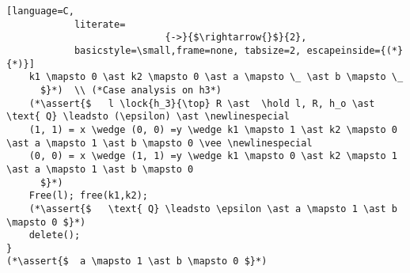 \documentclass[8pt]{article}
\newcommand{\lock}[2]{ \square \hspace{-1ex} \xrightarrow[#1]{#2}}
\newcommand{\hold}{\text{Hold }}
\newcommand{\assert}[1]{\textcolor{blue}{ \{ #1 \}  } }
\newcommand{\newlinespecial}{\newline \hphantom{100pt}}
\begin{document}
\begin{lstlisting}[language=C,
			literate=
               				{->}{$\rightarrow{}$}{2},
			basicstyle=\small,frame=none, tabsize=2, escapeinside={(*}{*)}]
	k1 \mapsto 0 \ast k2 \mapsto 0 \ast a \mapsto \_ \ast b \mapsto \_
	  $}*)  \\ (*Case analysis on h3*)
	(*\assert{$   l \lock{h_3}{\top} R \ast  \hold l, R, h_o \ast  \text{ Q} \leadsto (\epsilon) \ast \newlinespecial
	(1, 1) = x \wedge (0, 0) =y \wedge k1 \mapsto 1 \ast k2 \mapsto 0 \ast a \mapsto 1 \ast b \mapsto 0 \vee \newlinespecial
	(0, 0) = x \wedge (1, 1) =y \wedge k1 \mapsto 0 \ast k2 \mapsto 1 \ast a \mapsto 1 \ast b \mapsto 0
	  $}*) 
	Free(l); free(k1,k2);
	(*\assert{$   \text{ Q} \leadsto \epsilon \ast a \mapsto 1 \ast b \mapsto 0 $}*)
	delete();
}
(*\assert{$  a \mapsto 1 \ast b \mapsto 0 $}*)
	 
\end{lstlisting}







\newpage
\end{document}
